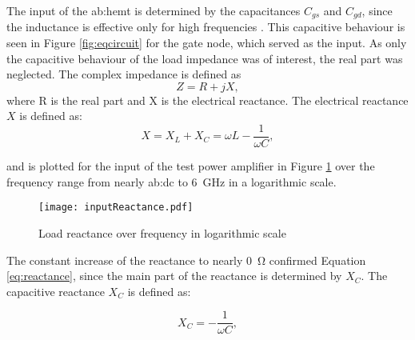 The input of the \gls{ab:hemt} is determined by the capacitances $C_{gs}$ and $C_{gd}$, since the inductance is effective only for high frequencies \cite{LSModel}.
This capacitive behaviour is seen in Figure \ref{fig:eqcircuit} for the gate node, which served as the input.
As only the capacitive behaviour of the load impedance was of interest, the real part was neglected.
The complex impedance is defined as
\begin{equation}
	Z = R + jX,
\label{eq:impedance}
\end{equation}
where R is the real part and X is the electrical reactance.
The electrical reactance $X$ is defined as:
\begin{equation}
	X = X_{L} + X_{C} = \omega L -\frac{1}{\omega C},
\label{eq:reactance}
\end{equation}

and is plotted for the input of the test power amplifier in Figure \ref{fig:inputReactance} over the frequency range from nearly \gls{ab:dc} to \SI{6}{\giga \hertz} in a logarithmic scale.

\begin{figure}[H]
	\centering
  \texttt{[image: inputReactance.pdf]}
	\caption{Load reactance over frequency in logarithmic scale}
	\label{fig:inputReactance}
\end{figure}


The constant increase of the reactance to nearly \SI{0}{\ohm} confirmed Equation \ref{eq:reactance}, since the main part of the reactance is determined by $X_{C}$.
The capacitive reactance $X_{C}$ is defined as:

\begin{equation}
	X_{C} = -\frac{1}{\omega C},
\end{equation}

